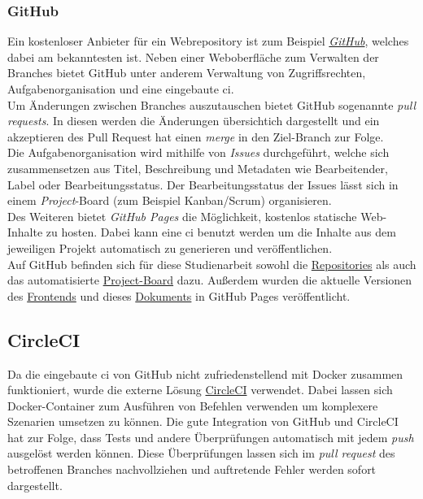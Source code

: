 \documentclass[12pt,twoside,a4paper]{article}
\begin{document}
\begin{sloppypar}
\subsubsection{GitHub}
Ein kostenloser Anbieter für ein Webrepository ist zum Beispiel \href{https://github.com/}{\textit{GitHub}}, welches dabei am bekanntesten ist. Neben einer Weboberfläche zum Verwalten der Branches bietet GitHub unter anderem Verwaltung von Zugriffsrechten, Aufgabenorganisation und eine eingebaute \acrshort{ci}.\\
Um Änderungen zwischen Branches auszutauschen bietet GitHub sogenannte \textit{pull requests}. In diesen werden die Änderungen übersichtich dargestellt und ein akzeptieren des Pull Request hat einen \textit{merge} in den Ziel-Branch zur Folge.\\
Die Aufgabenorganisation wird mithilfe von \textit{Issues} durchgeführt, welche sich zusammensetzen aus Titel, Beschreibung und Metadaten wie Bearbeitender, Label oder Bearbeitungsstatus. Der Bearbeitungsstatus der Issues lässt sich in einem \textit{Project}-Board (zum Beispiel Kanban/Scrum) organisieren.\\
Des Weiteren bietet \textit{GitHub Pages} die Möglichkeit, kostenlos statische Web-Inhalte zu hosten. Dabei kann eine \acrshort{ci} benutzt werden um die Inhalte aus dem jeweiligen Projekt automatisch zu generieren und veröffentlichen.\\
Auf GitHub befinden sich für diese Studienarbeit sowohl die \href{https://github.com/featherkraken}{Repositories} als auch das automatisierte \href{https://github.com/orgs/featherkraken/projects/1}{Project-Board} dazu. Außerdem wurden die aktuelle Versionen des \href{https://featherkraken.github.io/featherkraken-ui/}{Frontends} und dieses \href{https://featherkraken.github.io/featherkraken-paper/paper.pdf}{Dokuments} in GitHub Pages veröffentlicht.
\subsection{CircleCI}
Da die eingebaute \acrshort{ci} von GitHub nicht zufriedenstellend mit Docker zusammen funktioniert, wurde die externe Lösung \href{https://circleci.com/}{CircleCI} verwendet. Dabei lassen sich Docker-Container zum Ausführen von Befehlen verwenden um komplexere Szenarien umsetzen zu können. Die gute Integration von GitHub und CircleCI hat zur Folge, dass Tests und andere Überprüfungen automatisch mit jedem \textit{push} ausgelöst werden können. Diese Überprüfungen lassen sich im \textit{pull request} des betroffenen Branches nachvollziehen und auftretende Fehler werden sofort dargestellt.

\end{sloppypar}
\end{document}
